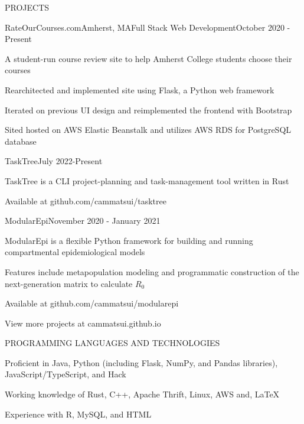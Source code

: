 \documentclass{article}
\begin{document}
\begin{bigsection}{PROJECTS}
    \begin{sectionitem}{RateOurCourses.com}{Amherst, MA}{Full Stack Web Development}{October 2020 - Present}
        \item A student-run course review site to help Amherst College students choose their
                courses
        \item Rearchitected and implemented site using Flask, a Python web framework
        \item Iterated on previous UI design and reimplemented the frontend with Bootstrap
        \item Sited hosted on AWS Elastic Beanstalk and utilizes AWS RDS for PostgreSQL database
    \end{sectionitem}

    \begin{litesectionitem}{TaskTree}{July 2022-Present}
        \item TaskTree is a CLI project-planning and task-management tool written in Rust
        \item Available at github.com/cammatsui/tasktree
    \end{litesectionitem}

    \begin{litesectionitem}{ModularEpi}{November 2020 - January 2021}
        \item ModularEpi is a flexible Python framework for building and running compartmental epidemiological models
        \item Features include metapopulation modeling and programmatic construction of the next-generation matrix to
            calculate $R_0$
        \item Available at github.com/cammatsui/modularepi
    \end{litesectionitem}
\end{bigsection}
\begin{adjustwidth}{0.2cm}{}View more projects at cammatsui.github.io\end{adjustwidth}
\vspace{0.1in}


\begin{litebigsection}{PROGRAMMING LANGUAGES AND TECHNOLOGIES}
    \item Proficient in Java, Python (including Flask, NumPy, and Pandas libraries), JavaScript/TypeScript, and Hack
    \item Working knowledge of Rust, C++, Apache Thrift, Linux, AWS and, \LaTeX
    \item Experience with R, MySQL, and HTML
\end{litebigsection}
\end{document}
